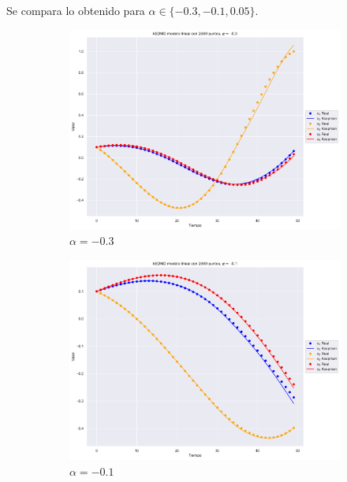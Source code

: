 Se compara lo obtenido para $\alpha \in \{ -0.3, -0.1, 0.05\}$.
\begin{figure}[htbp]
    \centering
    \begin{subfigure}[b]{0.32\textwidth}
        \centering
        \includegraphics[width=\textwidth]{img/content/chapter3/Linear1.pdf}
        \caption{$\alpha=-0.3$}
        \label{fig:image1}
    \end{subfigure}
    \hfill
    \begin{subfigure}[b]{0.32\textwidth}
        \centering
        \includegraphics[width=\textwidth]{img/content/chapter3/Linear2.pdf}
        \caption{$\alpha=-0.1$}
        \label{fig:image2}
    \end{subfigure}
    \hfill
    \begin{subfigure}[b]{0.32\textwidth}

\end{subfigure}
\end{figure}
